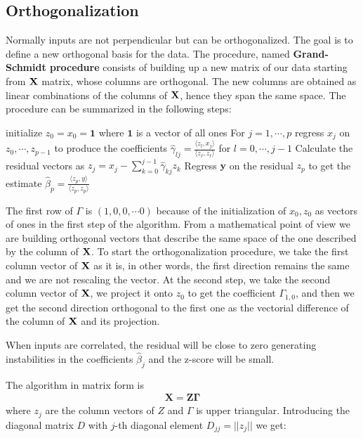 \subsection{Orthogonalization}
Normally inputs are not perpendicular but can be orthogonalized. The goal is to define a new orthogonal basis for the data. The procedure, named \textbf{Grand-Schmidt procedure} consists of building up a new matrix of our data starting from $\mathrm{\mathbf{X}}$ matrix, whose columns are orthogonal. The new columns are obtained as linear combinations of the columns of $\mathrm{\mathbf{X}}$, hence they span the same space. The procedure can be summarized in the following steps:
\begin{algorithm}[!ht]
initialize $z_0=x_0=\mathbf{1}$ where $\mathbf{1}$ is a vector of all ones\;
For $j=1,\cdots, p$ regress $x_j$ on $z_0,\cdots, z_{p-1}$ to produce the coefficients $\hat{\gamma}_{lj}= \frac{\langle z_l , x_j\rangle}{\langle z_\ell , z_\ell\rangle}$ for $l=0,\cdots, j-1$\;
Calculate the residual vectors as $z_j = x_j - \sum_{k=0}^{j-1} \hat{\gamma}_{kj}z_k$\;
Regress $\mathbf{y}$ on the residual $z_p$ to get the estimate $\hat{\beta}_p = \frac{\langle z_p, y\rangle}{\langle z_p , z_p\rangle}$
\end{algorithm}
The first row of $\Gamma$ is $(1, 0, 0,\cdots 0)$ because of the initialization of
$x_0, z_0$ as vectors of ones in the first step of the algorithm. From a mathematical point of view we are building orthogonal vectors that describe the same space of the one described by the column of $\mathrm{\mathbf{X}}$. To start the orthogonalization procedure, we take the first column vector of $\mathrm{\mathbf{X}}$ as it is, in other words, the first direction
remains the same and we are not rescaling the vector. At the second step, we take the second column vector of $\mathrm{\mathbf{X}}$, we project it onto $z_0$ to get the coefficient $\Gamma_{1,0}$, and then we get the second direction orthogonal to the first one as the vectorial difference of the column of $\mathrm{\mathbf{X}}$ and its projection.

When inputs are correlated, the residual will be close to zero generating instabilities in the coefficients $\hat{\beta}_j$ and the z-score will be small.

The algorithm in matrix form is
\begin{align*}
\mathbf{X = Z\Gamma}
\end{align*}
where $z_j$ are the column vectors of $Z$ and $\Gamma$ is upper triangular. Introducing the diagonal matrix $D$ with $j$-th diagonal element $D_{jj}=||z_j||$ we get:

